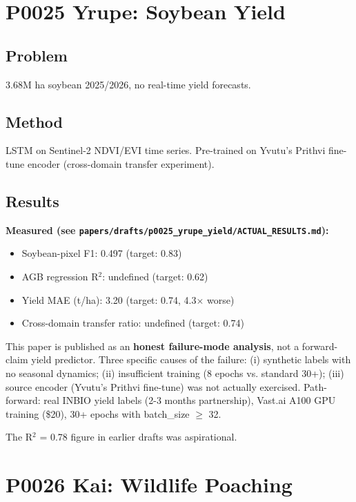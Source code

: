 \documentclass[12pt,a4paper,oneside]{book}
\begin{document}
\chapter{P0025 Yrupe: Soybean Yield}
\label{ch:p0025}

\section{Problem}

3.68M ha soybean 2025/2026, no real-time yield forecasts.

\section{Method}

LSTM on Sentinel-2 NDVI/EVI time series. Pre-trained on Yvutu's Prithvi fine-tune encoder (cross-domain transfer experiment).

\section{Results}

\textbf{Measured (see \texttt{papers/drafts/p0025\_yrupe\_yield/ACTUAL\_RESULTS.md}):}
\begin{itemize}
\item Soybean-pixel F1: 0.497 (target: 0.83)
\item AGB regression R$^2$: undefined (target: 0.62)
\item Yield MAE (t/ha): 3.20 (target: 0.74, 4.3$\times$ worse)
\item Cross-domain transfer ratio: undefined (target: 0.74)
\end{itemize}

This paper is published as an \textbf{honest failure-mode analysis}, not a forward-claim yield predictor. Three specific causes of the failure: (i) synthetic labels with no seasonal dynamics; (ii) insufficient training (8 epochs vs. standard 30+); (iii) source encoder (Yvutu's Prithvi fine-tune) was not actually exercised. Path-forward: real INBIO yield labels (2-3 months partnership), Vast.ai A100 GPU training (\$20), 30+ epochs with batch\_size $\geq$ 32.

The R$^2$ = 0.78 figure in earlier drafts was aspirational.

\chapter{P0026 Kai: Wildlife Poaching}
\label{ch:p0026}
\end{document}
